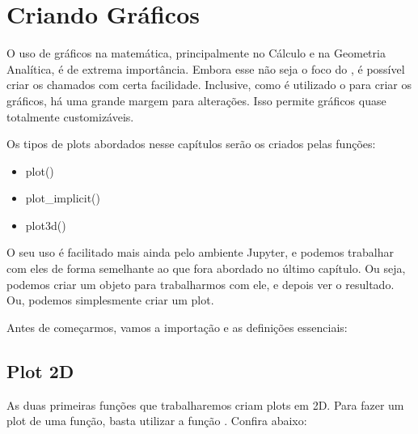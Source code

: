 \documentclass[letterpaper,10pt,english]{jupyterBook}
\begin{document}
\chapter{Criando Gráficos}
\label{\detokenize{chapters/5:criando-graficos}}\label{\detokenize{chapters/5::doc}}
\sphinxAtStartPar
O uso de gráficos na matemática, principalmente no Cálculo e na Geometria Analítica, é de extrema importância. Embora esse não seja o foco do , é possível criar os chamados  com certa facilidade. Inclusive, como é utilizado o  para criar os gráficos, há uma grande margem para alterações. Isso permite gráficos quase totalmente customizáveis.

\sphinxAtStartPar
Os tipos de plots abordados nesse capítulos serão os criados pelas funções:
\begin{itemize}
\item {} 
\sphinxAtStartPar
plot()

\item {} 
\sphinxAtStartPar
plot\_implicit()

\item {} 
\sphinxAtStartPar
plot3d()

\end{itemize}

\sphinxAtStartPar
O seu uso é facilitado mais ainda pelo ambiente Jupyter, e podemos trabalhar com eles de forma semelhante ao que fora abordado no último capítulo. Ou seja, podemos criar um objeto para trabalharmos com ele, e depois ver o resultado. Ou, podemos simplesmente criar um plot.

\sphinxAtStartPar
Antes de começarmos, vamos a importação e as definições essenciais:

\begin{sphinxVerbatim}[commandchars=\\\{\}]
   
    
 
\end{sphinxVerbatim}


\section{Plot 2D}
\label{\detokenize{chapters/5:plot-2d}}
\sphinxAtStartPar
As duas primeiras funções que trabalharemos criam plots em 2D. Para fazer um plot de uma função, basta utilizar a função . Confira abaixo:
\end{document}
